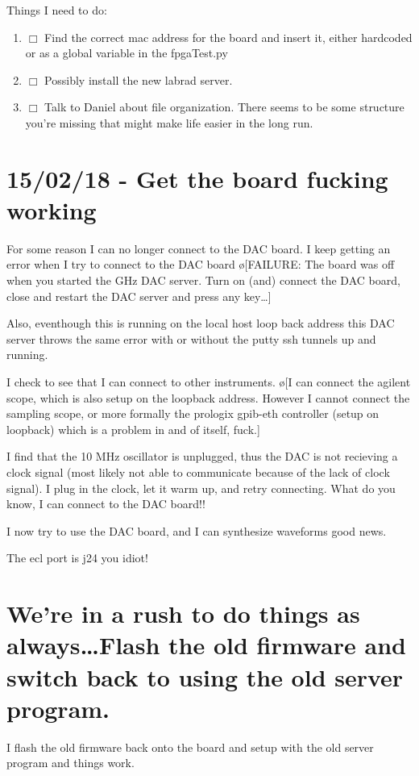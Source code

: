 \documentclass[10pt]{book}
\begin{document}
Things I need to do:
\begin{enumerate}
    \item $\Box$ Find the correct mac address for the board and insert it, either hardcoded or as a global variable in the fpgaTest.py
    \item $\Box$ Possibly install the new labrad server.
    \item $\Box$ Talk to Daniel about file organization. There seems to be some structure you're missing that might make life easier in the long run.
      
\end{enumerate}

\section{15/02/18 - Get the board fucking working}
For some reason I can no longer connect to the DAC board. I keep getting an error when I try to connect to the DAC board \o[FAILURE: The board was off when you started the GHz DAC server. Turn on (and) connect the DAC board, close and restart the DAC server and press any key\ldots ]{}

Also, eventhough this is running on the local host loop back address this DAC server throws the same error with or without the putty ssh tunnels up and running.

I check to see that I can connect to other instruments. \o[I can connect the agilent scope, which is also setup on the loopback address. However I cannot connect the sampling scope, or more formally the prologix gpib-eth controller (setup on loopback) which is a problem in and of itself, fuck.]{}

I find that the 10 MHz oscillator is unplugged, thus the DAC is not recieving a clock signal (most likely not able to communicate because of the lack of clock signal). I plug in the clock, let it warm up, and retry connecting. What do you know, I can connect to the DAC board!!

I now try to use the DAC board, and I can synthesize waveforms good news.

The ecl port is j24 you idiot!

\section{We're in a rush to do things as always\ldots Flash the old firmware and switch back to using the old server program.}

I flash the old firmware back onto the board and setup with the old server program and things work.
\end{document}
